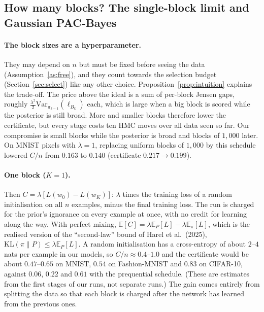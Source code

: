 \documentclass[11pt]{article}
\theoremstyle{definition}
\theoremstyle{remark}
\newcommand{\E}{\mathbb{E}}
\newcommand{\KL}{\mathrm{KL}}
\begin{document}
\subsection{How many blocks? The single-block limit and Gaussian PAC-Bayes}\label{sec:blocks}
\paragraph{The block sizes are a hyperparameter.} They may depend on $n$ but must be fixed before seeing the data
(Assumption~\ref{as:free}), and they count towards the selection budget (Section~\ref{sec:select}) like any other
choice. Proposition~\ref{prop:intuition} explains the trade-off. The price above the ideal is a sum of per-block Jensen
gaps, roughly $\frac{\lambda^2}2\mathrm{Var}_{\pi_{k-1}}(\ell_{B_k})$ each, which is large when a big block is scored while the
posterior is still broad. More and smaller blocks therefore lower the certificate, but every stage costs ten HMC moves
over all data seen so far. Our compromise is small blocks while the posterior is broad and blocks of $1{,}000$ later. On
MNIST pixels with $\lambda=1$, replacing uniform blocks of $1{,}000$ by this schedule lowered $C/n$ from $0.163$ to $0.140$
(certificate $0.217\to0.199$).

\paragraph{One block ($K=1$).} Then $C=\lambda[L(w_0)-L(w_K)]$: $\lambda$ times the training loss of a random
initialisation on all $n$ examples, minus the final training loss. The run is charged for the prior's ignorance on every
example at once, with no credit for learning along the way. With perfect mixing,
$\E[C]=\lambda\E_P[L]-\lambda\E_{\pi}[L]$, which is the realised version of the ``second-law'' bound of Harel et al.\
(2025), $\KL(\pi\|P)\le\lambda\E_P[L]$. A random initialisation has a cross-entropy of about $2$--$4$ nats per example in
our models, so $C/n\approx0.4$--$1.0$ and the certificate would be about $0.47$--$0.65$ on MNIST, $0.54$ on Fashion-MNIST and
$0.83$ on CIFAR-10, against $0.06$, $0.22$ and $0.61$ with the prequential schedule. (These are estimates from the
first stages of our runs, not separate runs.) The gain comes entirely from splitting the data so that each block is
charged after the network has learned from the previous ones.
\end{document}

